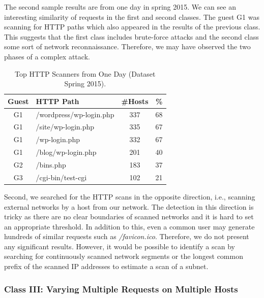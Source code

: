 The second sample results are from one day in spring 2015. We can see an interesting similarity of requests in the first and second classes. The guest G1 was scanning for HTTP paths which also appeared in the results of the previous class. This suggests that the first class includes brute-force attacks and the second class some sort of network reconnaissance. Therefore, we may have observed the two phases of a complex attack.

\begin{table}[ht]
\centering
\begin{tabular}{| c | l | c | r |} \hline
Guest & HTTP Path & \#Hosts & \% \\ \hline
G1 & /wordpress/wp-login.php & 337 & 68 \\ \hline
G1 & /site/wp-login.php & 335 & 67 \\ \hline
G1 & /wp-login.php & 332 & 67 \\ \hline
G1 & /blog/wp-login.php & 201 & 40 \\ \hline
G2 & /bins.php & 183 & 37 \\ \hline
G3 & /cgi-bin/test-cgi & 102 & 21 \\ \hline
\end{tabular}
\caption{Top HTTP Scanners from One Day (Dataset Spring 2015).}
\label{tab:httpsecurity-scanners2}
\end{table}

Second, we searched for the HTTP scans in the opposite direction, i.e., scanning external networks by a host from our network. The detection in this direction is tricky as there are no clear boundaries of scanned networks and it is hard to set an appropriate threshold. In addition to this, even a common user may generate hundreds of similar requests such as \textit{/favicon.ico}. Therefore, we do not present any significant results. However, it would be possible to identify a scan by searching for continuously scanned network segments or the longest common prefix of the scanned IP addresses to estimate a scan of a subnet.

\subsubsection{Class III: Varying Multiple Requests on Multiple Hosts}


